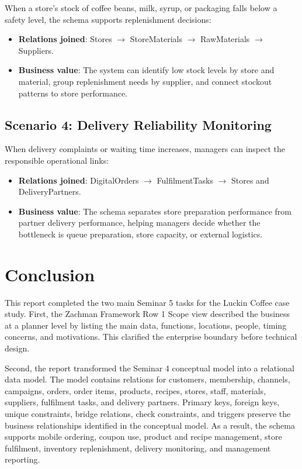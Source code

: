\documentclass[12pt,a4paper]{article}
\begin{document}
When a store's stock of coffee beans, milk, syrup, or packaging falls below a safety level, the schema supports replenishment decisions:
\begin{itemize}[leftmargin=1.3em]
  \item \textbf{Relations joined}: Stores $\rightarrow$ StoreMaterials $\rightarrow$ RawMaterials $\rightarrow$ Suppliers.
  \item \textbf{Business value}: The system can identify low stock levels by store and material, group replenishment needs by supplier, and connect stockout patterns to store performance.
\end{itemize}

\subsection{Scenario 4: Delivery Reliability Monitoring}

When delivery complaints or waiting time increases, managers can inspect the responsible operational links:
\begin{itemize}[leftmargin=1.3em]
  \item \textbf{Relations joined}: DigitalOrders $\rightarrow$ FulfilmentTasks $\rightarrow$ Stores and DeliveryPartners.
  \item \textbf{Business value}: The schema separates store preparation performance from partner delivery performance, helping managers decide whether the bottleneck is queue preparation, store capacity, or external logistics.
\end{itemize}

\section{Conclusion}

This report completed the two main Seminar 5 tasks for the Luckin Coffee case study. First, the Zachman Framework Row 1 Scope view described the business at a planner level by listing the main data, functions, locations, people, timing concerns, and motivations. This clarified the enterprise boundary before technical design.

Second, the report transformed the Seminar 4 conceptual model into a relational data model. The model contains relations for customers, membership, channels, campaigns, orders, order items, products, recipes, stores, staff, materials, suppliers, fulfilment tasks, and delivery partners. Primary keys, foreign keys, unique constraints, bridge relations, check constraints, and triggers preserve the business relationships identified in the conceptual model. As a result, the schema supports mobile ordering, coupon use, product and recipe management, store fulfilment, inventory replenishment, delivery monitoring, and management reporting.
\end{document}
